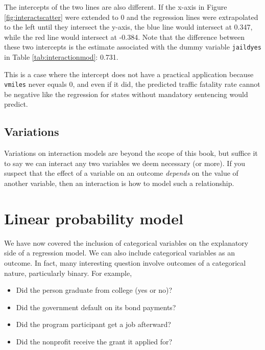 \documentclass[
]{book}
\providecommand{\tightlist}{%
  \setlength{\itemsep}{0pt}\setlength{\parskip}{0pt}}
\begin{document}
The intercepts of the two lines are also different. If the x-axis in Figure \ref{fig:interactscatter} were extended to 0 and the regression lines were extrapolated to the left until they intersect the y-axis, the blue line would intersect at 0.347, while the red line would intersect at -0.384. Note that the difference between these two intercepts is the estimate associated with the dummy variable \texttt{jaildyes} in Table \ref{tab:interactionmod}: 0.731.

This is a case where the intercept does not have a practical application because \texttt{vmiles} never equals 0, and even if it did, the predicted traffic fatality rate cannot be negative like the regression for states without mandatory sentencing would predict.

\hypertarget{variations}{%
\subsection{Variations}\label{variations}}

Variations on interaction models are beyond the scope of this book, but suffice it to say we can interact any two variables we deem necessary (or more). If you suspect that the effect of a variable on an outcome \emph{depends} on the value of another variable, then an interaction is how to model such a relationship.

\hypertarget{linear-probability-model}{%
\section{Linear probability model}\label{linear-probability-model}}

We have now covered the inclusion of categorical variables on the explanatory side of a regression model. We can also include categorical variables as an outcome. In fact, many interesting question involve outcomes of a categorical nature, particularly binary. For example,

\begin{itemize}
\tightlist
\item
  Did the person graduate from college (yes or no)?
\item
  Did the government default on its bond payments?
\item
  Did the program participant get a job afterward?
\item
  Did the nonprofit receive the grant it applied for?
\end{itemize}
\end{document}
